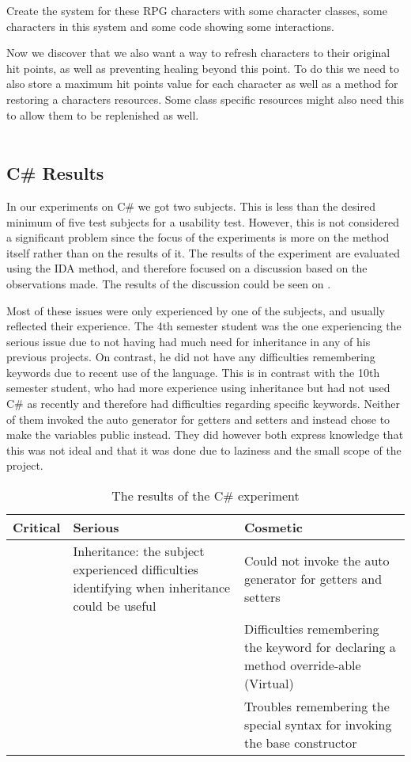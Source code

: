 Create the system for these RPG characters with some character classes, some characters in this system and some code showing some interactions.

Now we discover that we also want a way to refresh characters to their original hit points, as well as preventing healing beyond this point.
To do this we need to also store a maximum hit points value for each character as well as a method for restoring a characters resources.
Some class specific resources might also need this to allow them to be replenished as well.
\\\\
\subsection{C\# Results}

In our experiments on C\# we got two subjects. This is less than the desired minimum of five test subjects for a usability test. However, this is not considered a significant problem since the focus of the experiments is more on the method itself rather than on the results of it. The results of the experiment are evaluated using the IDA method, and therefore focused on a discussion based on the observations made. The results of the discussion could be seen on .

Most of these issues were only experienced by one of the subjects, and usually reflected their experience. The 4th semester student was the one experiencing the serious issue due to not having had much need for inheritance in any of his previous projects.
On contrast, he did not have any difficulties remembering keywords due to recent use of the language.
This is in contrast with the 10th semester student, who had more experience using inheritance but had not used C\# as recently and therefore had difficulties regarding specific keywords.
Neither of them invoked the auto generator for getters and setters and instead chose to make the variables public instead. They did however both express knowledge that this was not ideal and that it was done due to laziness and the small scope of the project.\\

\begin{table} [!h]
\centering
\renewcommand{\arraystretch}{1.5}
\begin{tabular}{| p{5cm} | p{5cm} | p{5cm} |}
\hline
Critical & Serious     & Cosmetic \\ \hline
		 & Inheritance: the subject experienced difficulties identifying when inheritance could be useful & Could not invoke the auto generator for getters and setters \\ \hline 
		 & & Difficulties remembering the keyword for declaring a method override-able (Virtual) \\ \hline
		 & & Troubles remembering the special syntax for invoking the base constructor \\ \hline
\end{tabular}
\caption{The results of the C\# experiment}
\label{table:UsabilityResults}
\end{table}

